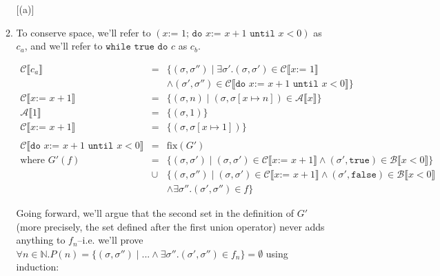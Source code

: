 \documentclass[10pt, oneside]{article}
\begin{document}
\begin{enumerate}[1.]
\begin{enumerate} [(a)]
    \item
      To conserve space, we'll refer to 
      $(x \texttt{:= }1\texttt{; do } x \texttt{:= } x + 1 \texttt{ until } x < 0)$ 
      as $c_a$, and we'll refer to $\texttt{while true do } c$ as $c_b$. 
      
      \begin{eqnarray*}
        \mathcal{C} \llbracket c_a \rrbracket & = & 
          \{(\sigma, \sigma'') \mid \exists \sigma'. 
            (\sigma, \sigma') \in \mathcal{C}\llbracket x\texttt{:= } 1\rrbracket \\
     & & \wedge (\sigma', \sigma'') \in \mathcal{C} \llbracket \texttt{do } x 
                               \texttt{:= } x + 1 \texttt{ until } x < 0 \rrbracket
                                   \} \\
        \mathcal{C} \llbracket x \texttt{:= } x+1 \rrbracket & = & \{(\sigma, n) \mid (\sigma, \sigma[x \mapsto n]) \in \mathcal{A} \llbracket x \rrbracket  \} \\
        \mathcal{A} \llbracket 1 \rrbracket & = & \{(\sigma, 1) \} \\
        \mathcal{C} \llbracket x \texttt{:= } x+1 \rrbracket & = & \{ (\sigma, \sigma[x \mapsto 1]) \} \\
        & & \\
        \mathcal{C} \llbracket \texttt{do } x \texttt{:= } x + 1 \texttt{ until } x < 0 \rrbracket & = & \text{fix}(G') \\
        \text{where } G'(f) & = & \{ (\sigma, \sigma') \mid (\sigma, \sigma') \in \mathcal{C} \llbracket x \texttt{:= } x + 1 \rrbracket \wedge (\sigma', \texttt{true}) \in \mathcal{B} \llbracket x < 0 \rrbracket \} \\
				& \cup & \{ (\sigma, \sigma'') \mid (\sigma, \sigma')  \in \mathcal{C} \llbracket x \texttt{:= } x + 1 \rrbracket \wedge (\sigma', \texttt{false})\in \mathcal{B} \llbracket x < 0 \rrbracket \\
				& & \wedge \exists \sigma''. (\sigma', \sigma'') \in f \}
      \end{eqnarray*}
      
      Going forward, we'll argue that the second set in the definition of $G'$ 
      (more precisely, the set defined after the first union operator) never adds 
      anything to $f_n$--i.e. we'll prove $\forall n \in \mathbb{N}. 
      P(n) = \{ (\sigma, \sigma'') \mid ... \wedge \exists \sigma''. (\sigma', 
      \sigma'') \in f_n \} = \emptyset$ using induction:
      

\end{enumerate}
\end{enumerate}
\end{document}
